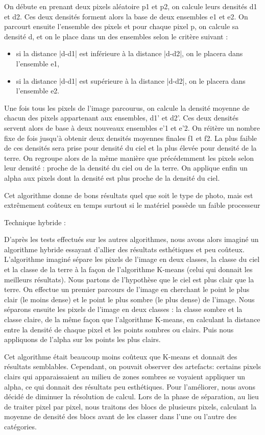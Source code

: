\documentclass{report}
\begin{document}
On débute en prenant deux pixels aléatoire p1 et p2, on calcule leurs densités d1 et d2. Ces deux densités forment alors la base de deux ensembles e1 et e2. On parcourt ensuite l’ensemble des pixels et pour chaque pixel p, on calcule sa densité d, et on le place dans un des ensembles selon le critère suivant :
\begin{itemize}
\item si la distance |d-d1| est inférieure à la distance |d-d2|, on le placera dans l’ensemble e1,
\item si la distance |d-d1| est supérieure à la distance |d-d2|, on le placera dans l’ensemble e2.
\end{itemize}
Une fois tous les pixels de l’image parcourus, on calcule la densité moyenne de chacun des pixels appartenant aux ensembles, d1’ et d2’. Ces deux densités servent alors de base à deux nouveaux ensembles e’1 et e’2. On réitère un nombre fixe de fois jusqu’à obtenir deux densités moyennes finales f1 et f2. La plus faible de ces densités sera prise pour densité du ciel et la plus élevée pour densité de la terre. On regroupe alors de la même manière que précédemment les pixels selon leur densité : proche de la densité du ciel ou de la terre. On applique enfin un alpha aux pixels dont la densité est plus proche de la densité du ciel.


Cet algorithme donne de bons résultats quel que soit le type de photo, mais est extrêmement coûteux en temps surtout si le matériel possède un faible processeur

Technique hybride :

D’après les tests effectués sur les autres algorithmes, nous avons alors imaginé un algorithme hybride essayant d’allier des résultats esthétiques et peu coûteux.
L’algorithme imaginé sépare les pixels de l’image en deux classes, la classe du ciel et la classe de la terre à la façon de l’algorithme K-means (celui qui donnait les meilleurs résultats). Nous partons de l’hypothèse que le ciel est plus clair que la terre. On effectue un premier parcours de l’image en cherchant le point le plus clair (le moins dense) et le point le plus sombre (le plus dense) de l’image. Nous séparons ensuite les pixels de l’image en deux classes : la classe sombre et la classe claire, de la même façon que l’algorithme K-means, en calculant la distance entre la densité de chaque pixel et les points sombres ou clairs. Puis nous appliquons de l’alpha sur les points les plus clairs.

Cet algorithme était beaucoup moins coûteux que K-means et donnait des résultats semblables.
Cependant, on pouvait observer des artefacts: certains pixels clairs qui apparaissaient au milieu de zones sombres se voyaient appliquer un alpha, ce qui donnait des résultats peu esthétiques. Pour l’améliorer, nous avons décidé de diminuer la résolution de calcul. Lors de la phase de séparation, au lieu de traiter pixel par pixel, nous traitons des blocs de plusieurs pixels, calculant la moyenne de densité des blocs avant de les classer dans l’une ou l’autre des catégories.
\end{document}
